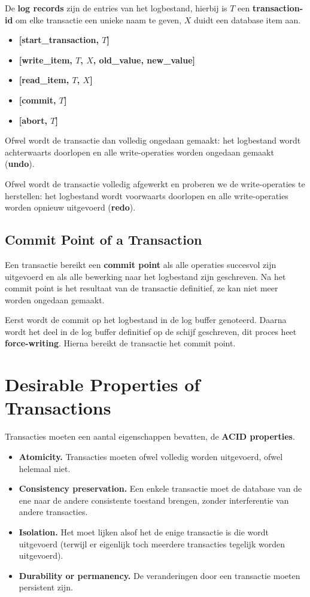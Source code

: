 De \textbf{log records} zijn de entries van het logbestand, hierbij is $T$ een \textbf{transaction-id} om elke transactie een unieke naam te geven, $X$ duidt een database item aan.
\vspace{-1mm}
\begin{itemize}\addtolength{\itemsep}{-0.3\baselineskip}
	\item \textbf{[start\_transaction, $T$]}
	\item \textbf{[write\_item, $T$, $X$, old\_value, new\_value]}
	\item \textbf{[read\_item, $T$, $X$]}
	\item \textbf{[commit, $T$]}
	\item \textbf{[abort, $T$]}
\end{itemize}
Ofwel wordt de transactie dan volledig ongedaan gemaakt: het logbestand wordt achterwaarts doorlopen en alle write-operaties worden ongedaan gemaakt (\textbf{undo}).

Ofwel wordt de transactie volledig afgewerkt en proberen we de write-operaties te herstellen: het logbestand wordt voorwaarts doorlopen en alle write-operaties worden opnieuw uitgevoerd (\textbf{redo}).


\subsection{Commit Point of a Transaction}
Een transactie bereikt een \textbf{commit point} als alle operaties succesvol zijn uitgevoerd en als alle bewerking naar het logbestand zijn geschreven. Na het commit point is het resultaat van de transactie definitief, ze kan niet meer worden ongedaan gemaakt.

Eerst wordt de commit op het logbestand in de log buffer genoteerd. Daarna wordt het deel in de log buffer definitief op de schijf geschreven, dit proces heet \textbf{force-writing}. Hierna bereikt de transactie het commit point.



\section{Desirable Properties of Transactions}
Transacties moeten een aantal eigenschappen bevatten, de \textbf{ACID properties}.
\begin{itemize}
	\item \textbf{Atomicity.} Transacties moeten ofwel volledig worden uitgevoerd, ofwel helemaal niet.
	\item \textbf{Consistency preservation.} Een enkele transactie moet de database van de ene naar de andere consistente toestand brengen, zonder interferentie van andere transacties.
	\item \textbf{Isolation.} Het moet lijken alsof het de enige transactie is die wordt uitgevoerd (terwijl er eigenlijk toch meerdere transacties tegelijk worden uitgevoerd).
	\item \textbf{Durability or permanency.} De veranderingen door een transactie moeten persistent zijn.
\end{itemize}




